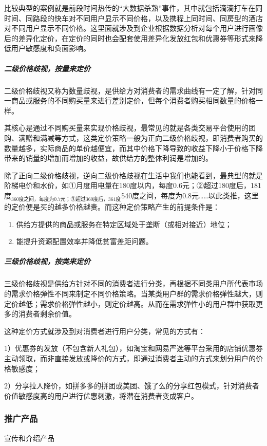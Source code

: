 \documentclass[letterpaper,10pt,english]{sphinxmanual}
\begin{document}
比较典型的案例就是前段时间热传的“大数据杀熟”事件，其中就包括滴滴打车在同时间、同路段的快车对不同用户显示不同价格，以及携程上同时间、同房型的酒店对不同用户显示不同价格。这里面就涉及到企业根据数据分析对每个用户进行画像后的差异化定价，在定价的同时也会配套使用差异化发放红包和优惠券等形式来降低用户敏感度和负面影响。


\subparagraph{二级价格歧视，按量来定价}
\label{\detokenize{chapter_knowledge/price:id6}}
二级价格歧视又称为数量歧视，是供给方对消费者的需求曲线有一定了解，针对同一商品或服务的不同购买量来进行差别定价，但每个消费者购买相同数量的价格一样。

其核心是通过不同购买量来实现价格歧视，最常见的就是各类交易平台使用的团购、满赠和满减等方式，这类定价策略一般为正向二级价格歧视，即消费者购买的数量越多，实际商品的单价越便宜，而其中价格下降导致的收益下降小于价格下降带来的销量的增加而增加的收益，故供给方的整体利润是增加的。

除了正向二级价格歧视，逆向二级价格歧视在生活中我们也能看到，最典型的就是阶梯电价和水价，如①月度用电量在180度以内，每度0.6元；②超过180度后，181度$_{\text{360度之间，每度为0.7元；③超过360度后，361度}}$540度之间，每度为0.8元……以此类推，这里的定价便是买的越多价格越贵。而这种定价策略产生的前提条件是：
\begin{enumerate}
%
\item {} 
供给方提供的商品或服务在特定区域处于垄断（或相对接近）地位；

\item {} 
能提升资源配置效率并降低贫富差距问题。

\end{enumerate}


\subparagraph{三级价格歧视，按类来定价}
\label{\detokenize{chapter_knowledge/price:id7}}
三级价格歧视是供给方针对不同的消费者进行分类，再根据不同类用户所代表市场的需求价格弹性不同来制定不同价格策略。当某类用户群的需求价格弹性越大，则定价越低；需求价格弹性越小，则定价越高。从而在需求弹性小的用户群中获取更多的消费者剩余价值。

这种定价方式就涉及到对消费者进行用户分类，常见的方式有：

1）优惠券的发放（不包含新人礼包），如淘宝和网易严选等平台采用的店铺优惠券主动领取，而非直接发放或降价的方式，即通过消费者主动的方式来划分用户的价格敏感度；

2）分享拉人降价，如拼多多的拼团或美团、饿了么的分享红包模式，针对消费者价值敏感度高的用户进行优惠刺激，将潜在消费者变成客户。


\subsubsection{推广产品}
\label{\detokenize{chapter_knowledge/more_users:id1}}\label{\detokenize{chapter_knowledge/more_users::doc}}
宣传和介绍产品
\end{document}
